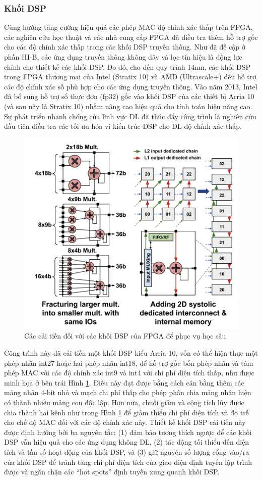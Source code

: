 \documentclass[a4paper]{article}
\begin{document}
\subsubsection{Khối DSP}
Cùng hướng tăng cường hiệu quả các phép MAC độ chính xác thấp trên FPGA, các nghiên cứu học thuật và các nhà cung cấp FPGA đã điều tra thêm hỗ trợ gốc cho các độ chính xác thấp trong các khối DSP truyền thống. Như đã đề cập ở phần III-B, các ứng dụng truyền thông không dây và lọc tín hiệu là động lực chính cho thiết kế các khối DSP. Do đó, cho đến quy trình 14nm, các khối DSP trong FPGA thương mại của Intel (Stratix 10) và AMD (Ultrascale+) đều hỗ trợ các độ chính xác số phù hợp cho các ứng dụng truyền thông. Vào năm 2013, Intel đã bổ sung hỗ trợ số thực đơn (fp32) gốc vào khối DSP của các thiết bị Arria 10 (và sau này là Stratix 10) nhằm nâng cao hiệu quả cho tính toán hiệu năng cao. Sự phát triển nhanh chóng của lĩnh vực DL đã thúc đẩy công trình là nghiên cứu đầu tiên 
điều tra các tối ưu hóa vi kiến trúc DSP cho DL độ chính xác thấp.
\begin{figure} [!h]
    \centering
    \includegraphics[width=0.75\linewidth]{assets/fpga_14.png}
    \caption{Các cải tiến đối với các khối DSP của FPGA để phục vụ học sâu}
    \label{fig:fpga_14}
\end{figure}

Công trình này đã cải tiến một khối DSP kiểu Arria-10, vốn có thể hiện thực một phép nhân int27 hoặc hai phép nhân int18, để hỗ trợ gốc bốn phép nhân và tám phép MAC với các độ chính xác int9 và int4 với chi phí diện tích thấp, như được minh họa ở bên trái Hình \ref{fig:fpga_14}. Điều này đạt được bằng cách cân bằng thêm các mảng nhân 4-bit nhỏ và mạch chi phí thấp cho phép phân chia mảng nhân hiện có thành nhiều mảng con độc lập. Hơn nữa, chuỗi giảm và cộng tích lũy được chia thành hai kênh như trong Hình \ref{fig:fpga_14} để giảm thiểu chi phí diện tích và độ trễ cho chế độ MAC đối với các độ chính xác này. Thiết kế khối DSP cải tiến này được định hướng bởi ba nguyên tắc: (1) đảm bảo tương thích ngược để các khối DSP vẫn hiệu quả cho các ứng dụng không DL, (2) tác động tối thiểu đến diện tích và tần số hoạt động của khối DSP, và (3) giữ nguyên số lượng cổng vào/ra của khối DSP để tránh tăng chi phí diện tích của giao diện định tuyến lập trình được và ngăn chặn các “hot spots” định tuyến xung quanh khối DSP.
\end{document}
